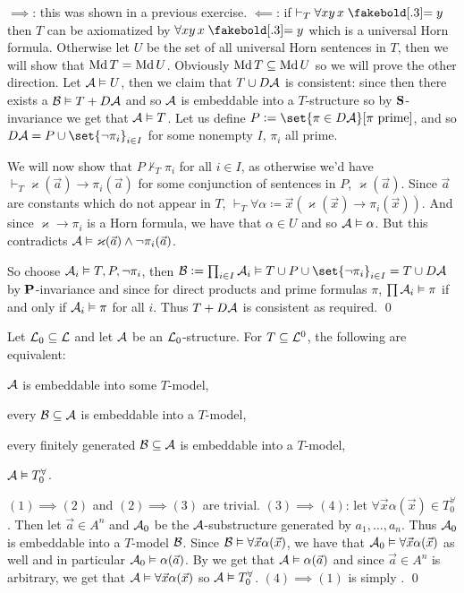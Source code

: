 \ethrm

$\implies$: this was shown in a previous exercise.
$\impliedby$: if $\vdash_T\forall xy\,x\eq y$ then $T$ can be axiomatized by $\forall xy\,x\eq y$ which is a universal Horn formula.
Otherwise let $U$ be the set of all universal Horn sentences in $T$, then we will show that $\mathop{\rm Md} T=\mathop{\rm Md} U$.
Obviously $\mathop{\rm Md} T\subseteq\mathop{\rm Md} U$ so we will prove the other direction.
Let ${\cal A}\vDash U$, then we claim that $T\cup D{\cal A}$ is consistent: since then there exists a ${\cal B}\vDash T+D{\cal A}$ and so ${\cal A}$ is embeddable into a $T$-structure so by
${\bf S}$-invariance we get that ${\cal A}\vDash T$.
Let us define $P\coloneqq\set{\pi\in D{\cal A}}[\hbox{$\pi$ prime}]$, and so $D{\cal A}=P\cup\set{\neg\pi_i}_{i\in I}$ for some nonempty $I$, $\pi_i$ all prime.

We will now show that $P\nvdash_T\pi_i$ for all $i\in I$, as otherwise we'd have $\vdash_T\varkappa(\vec a)\to\pi_i(\vec a)$ for some conjunction of sentences in $P$, $\varkappa(\vec a)$.
Since $\vec a$ are constants which do not appear in $T$, $\vdash_T\forall\alpha\coloneqq\vec x(\varkappa(\vec x)\to\pi_i(\vec x))$.
And since $\varkappa\to\pi_i$ is a Horn formula, we have that $\alpha\in U$ and so ${\cal A}\vDash\alpha$.
But this contradicts ${\cal A}\vDash\varkappa(\vec a)\land\neg\pi_i(\vec a)$.

So choose ${\cal A}_i\vDash T,P,\neg\pi_i$, then ${\cal B}\coloneqq\prod_{i\in I}{\cal A}_i\vDash T\cup P\cup\set{\neg\pi_i}_{i\in I}=T\cup D{\cal A}$ by ${\bf P}$-invariance and since for direct products
and prime formulas $\pi$, $\prod{\cal A}_i\vDash\pi$ if and only if ${\cal A}_i\vDash\pi$ for all $i$.
Thus $T+D{\cal A}$ is consistent as required.
\qed

\bthrm

    Let ${\cal L}_0\subseteq{\cal L}$ and let ${\cal A}$ be an ${\cal L}_0$-structure.
    For $T\subseteq{\cal L}^0$, the following are equivalent:
    \benum
        \item ${\cal A}$ is embeddable into some $T$-model,
        \item every ${\cal B}\subseteq{\cal A}$ is embeddable into a $T$-model,
        \item every finitely generated ${\cal B}\subseteq{\cal A}$ is embeddable into a $T$-model,
        \item ${\cal A}\vDash T_0^\forall$.
    \eenum

\ethrm

$(1)\implies(2)$ and $(2)\implies(3)$ are trivial.
$(3)\implies(4)$: let $\forall\vec x\alpha(\vec x)\in T_0^\forall$.
Then let $\vec a\in A^n$ and ${\cal A}_0$ be the ${\cal A}$-substructure generated by $a_1,\dots,a_n$.
Thus ${\cal A}_0$ is embeddable into a $T$-model ${\cal B}$.
Since ${\cal B}\vDash\forall\vec x\alpha(\vec x)$, we have that ${\cal A}_0\vDash\forall\vec x\alpha(\vec x)$ as well and in particular ${\cal A}_0\vDash\alpha(\vec a)$.
By  we get that ${\cal A}\vDash\alpha(\vec a)$ and since $\vec a\in A^n$ is arbitrary, we get that ${\cal A}\vDash\forall\vec x\alpha(\vec x)$ so ${\cal A}\vDash T_0^\forall$.
$(4)\implies(1)$ is simply .
\qed

